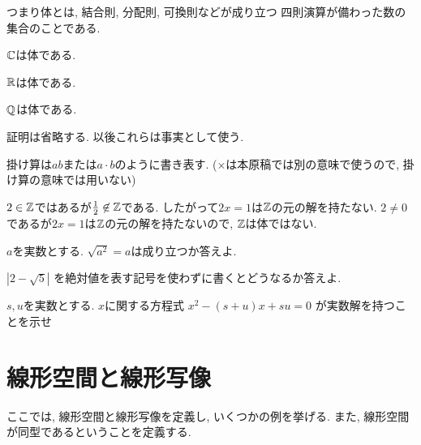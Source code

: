 \begin{remark}
  つまり体とは,
  結合則, 分配則, 可換則などが成り立つ
  四則演算が備わった数の集合のことである.
\end{remark}


\begin{example}
  $\mathbb{C}$は体である.
\end{example}
\begin{example}
  $\mathbb{R}$は体である.
\end{example}
\begin{example}
  $\mathbb{Q}$は体である.
\end{example}
\begin{remark}
  証明は省略する.
  以後これらは事実として使う.
\end{remark}
\begin{remark}
  掛け算は$ab$または$a\cdot b$のように書き表す.
  ($\times$は本原稿では別の意味で使うので,
  掛け算の意味では用いない)
\end{remark}


\begin{example}
  $2\in\mathbb{Z}$ではあるが$\frac{1}{2}\not\in \mathbb{Z}$である.
  したがって$2x=1$は$\mathbb{Z}$の元の解を持たない.
  $2\neq 0$であるが$2x=1$は$\mathbb{Z}$の元の解を持たないので,
  $\mathbb{Z}$は体ではない.
\end{example}



\begin{quiz}
  $a$を実数とする.
  $\sqrt{a^2}=a$は成り立つか答えよ.
\end{quiz}


\begin{quiz}
$|2-\sqrt{5}|$
を絶対値を表す記号を使わずに書くとどうなるか答えよ.
\end{quiz}

\begin{quiz}
    $s,u$を実数とする.
    $x$に関する方程式
    $x^2-(s+u)x+su=0$
    が実数解を持つことを示せ
\end{quiz}


\chapter{線形空間と線形写像}
ここでは, 線形空間と線形写像を定義し,
いくつかの例を挙げる.
また, 線形空間が同型であるということを定義する.

